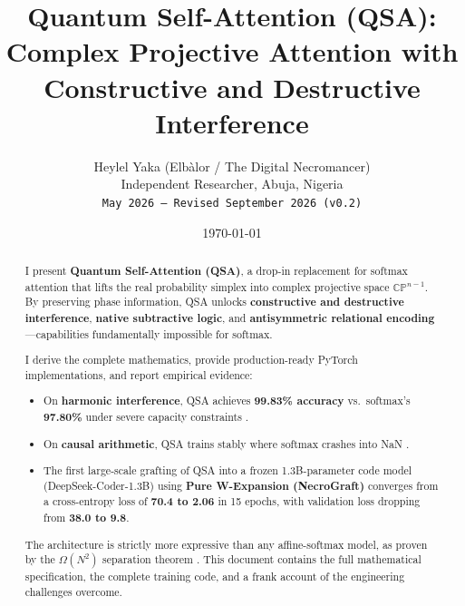 \documentclass[11pt]{article}
\title{Quantum Self-Attention (QSA): Complex Projective Attention with Constructive and Destructive Interference}
\author{
  Heylel Yaka (Elbàlor / The Digital Necromancer) \\
  \small Independent Researcher, Abuja, Nigeria \\
  \small \texttt{May 2026 -- Revised September 2026 (v0.2)}
}
\date{\today}
\begin{document}
\maketitle

\vspace{0.5em}
\noindent{}

\begin{abstract}
I present \textbf{Quantum Self-Attention (QSA)}, a drop-in replacement for softmax attention that lifts the real probability simplex into complex projective space \(\mathbb{C}\mathbb{P}^{n-1}\). By preserving phase information, QSA unlocks \textbf{constructive and destructive interference}, \textbf{native subtractive logic}, and \textbf{antisymmetric relational encoding}---capabilities fundamentally impossible for softmax.

I derive the complete mathematics, provide production-ready PyTorch implementations, and report empirical evidence:

\begin{itemize}
    \item On \textbf{harmonic interference}, QSA achieves \textbf{99.83\% accuracy} vs.\ softmax's \textbf{97.80\%} under severe capacity constraints \cite{yaka2026qsa}.
    \item On \textbf{causal arithmetic}, QSA trains stably where softmax crashes into NaN \cite{yaka2026qsa}.
    \item The first large-scale grafting of QSA into a frozen 1.3B-parameter code model (DeepSeek-Coder-1.3B) using \textbf{Pure W-Expansion (NecroGraft)} \cite{yaka2026pure} converges from a cross-entropy loss of \textbf{70.4 to 2.06} in 15 epochs, with validation loss dropping from \textbf{38.0 to 9.8}.
\end{itemize}

The architecture is strictly more expressive than any affine-softmax model, as proven by the \(\Omega(N^2)\) separation theorem \cite{nebli2026}. This document contains the full mathematical specification, the complete training code, and a frank account of the engineering challenges overcome.
\end{abstract}
\end{document}
